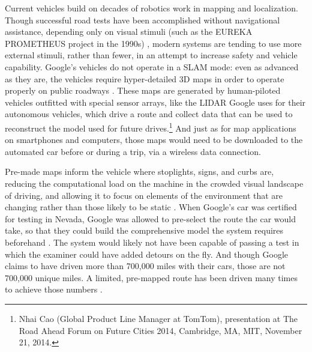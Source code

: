 
Current vehicles build on decades of robotics work in mapping and localization. Though successful
road tests have been accomplished without navigational assistance,
depending only on visual stimuli (such as the EUREKA PROMETHEUS project
in the 1990s) \cite{ulmerVITA}, modern systems are tending to use more external
stimuli, rather than fewer, in an attempt to increase safety and
vehicle capability. Google's vehicles do not operate in a SLAM mode: even as
advanced as they are, the vehicles require
hyper-detailed 3D maps in order to operate properly on public
roadways \cite{gomesObstacles}. These maps are generated by human-piloted vehicles outfitted with
special sensor arrays, like the LIDAR Google uses for their autonomous
vehicles, which drive a route and collect data that can be used to
reconstruct the model used for future drives.\footnote{Nhai Cao
  (Global Product Line Manager at TomTom), presentation at The Road
  Ahead Forum on Future Cities 2014, Cambridge, MA, MIT, November 21,
  2014.} And just as for map applications on smartphones and computers,
those maps would need to be downloaded to the automated car before or
during a trip, via a wireless data connection.


Pre-made maps inform the vehicle where stoplights, signs,
and curbs are, reducing the computational load on the machine in the
crowded visual landscape of driving, and allowing it to focus on
elements of the environment that are changing rather than those likely
to be static \cite{gomesObstacles}. When Google's car was certified for
testing in Nevada, Google was allowed to pre-select the route the car
would take, so that they could build the comprehensive model the
system requires beforehand \cite{harrisNevada}. The system would likely not have been
capable of passing a test in which the examiner could have added
detours on the fly. And though Google claims to have driven more than
700,000 miles with their cars, those are not 700,000 unique miles. A
limited, pre-mapped route has been driven many times to
achieve those numbers \cite{gomesCircles}.

